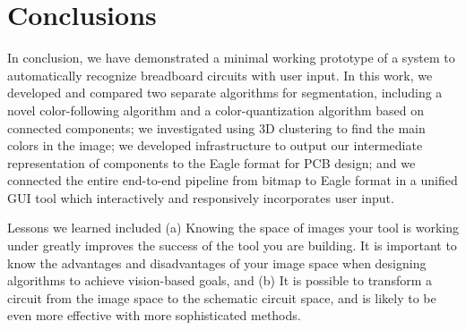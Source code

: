 \documentclass[10pt,twocolumn,letterpaper]{article}
\begin{document}
\section{Conclusions}

In conclusion, we have demonstrated a minimal working prototype of a
system to automatically recognize breadboard circuits with user
input. In this work, we developed and compared two separate algorithms
for segmentation, including a novel color-following algorithm and a
color-quantization algorithm based on connected components; we
investigated using 3D clustering to find the main colors in the image;
we developed infrastructure to output our intermediate representation
of components to the Eagle format for PCB design; and we connected the
entire end-to-end pipeline from bitmap to Eagle format in a unified
GUI tool which interactively and responsively incorporates user input.

Lessons we learned included (a) Knowing the space of images your tool
is working under greatly improves the success of the tool you are
building. It is important to know the advantages and disadvantages of
your image space when designing algorithms to achieve vision-based
goals, and (b) It is possible to transform a circuit from the image
space to the schematic circuit space, and is likely to be even more
effective with more sophisticated methods.

{\small


}
\end{document}
